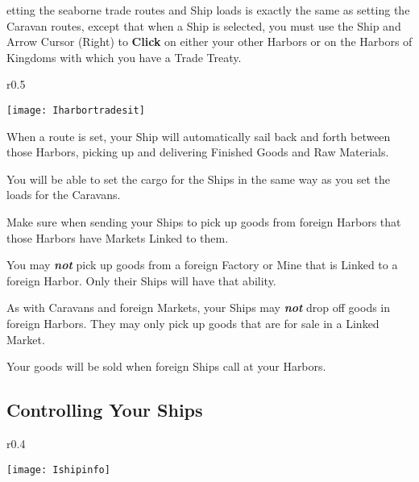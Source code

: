 etting the seaborne trade routes and Ship loads is exactly the same as setting the Caravan routes, except that when a Ship is selected, you must use the Ship and Arrow Cursor (Right) to \textbf{Click} on either your other Harbors or on the Harbors of Kingdoms with which you have a Trade Treaty.

\begin{wrapfigure}{r}{0.5\textwidth}
    \vspace{-20pt}
    \begin{center}
        \texttt{[image: Iharbortradesit]} %
    \end{center}
    \vspace{-20pt}
\end{wrapfigure}

When a route is set, your Ship will automatically sail back and forth between those Harbors, picking up and delivering Finished Goods and Raw Materials.

You will be able to set the cargo for the Ships in the same way as you set the loads for the Caravans.

Make sure when sending your Ships to pick up goods from foreign Harbors that those Harbors have Markets Linked to them.

You may \textbf{\textit{not}} pick up goods from a foreign Factory or Mine that is Linked to a foreign Harbor. Only their Ships will have that ability.

As with Caravans and foreign Markets, your Ships may \textbf{\textit{not}} drop off goods in foreign Harbors. They may only pick up goods that are for sale in a Linked Market.

Your goods will be sold when foreign Ships call at your Harbors.

\subsection{\textsf{Controlling Your Ships}}


\begin{wrapfigure}{r}{0.4\textwidth}
    \vspace{-20pt}
    \begin{center}
        \texttt{[image: Ishipinfo]} %
    \end{center}
    \vspace{-20pt}
\end{wrapfigure}

